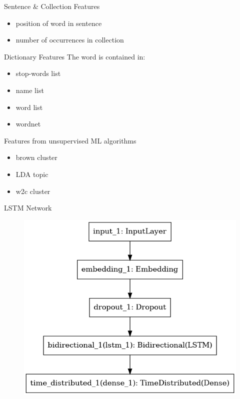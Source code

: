 \documentclass[12pt, tikz]{beamer}
\begin{document}
\begin{frame}[fragile]{Sentence \& Collection Features}
	\begin{itemize}
		\item position of word in sentence
		\item number of occurrences in collection
	\end{itemize}
\end{frame}

\begin{frame}[fragile]{Dictionary Features}
	The word is contained in:
	\begin{itemize}
		\item stop-words list
		\item name list
		\item word list
		\item wordnet
	\end{itemize}
\end{frame}

\begin{frame}[fragile]{Features from unsupervised ML algorithms}
	\begin{itemize}
		\item brown cluster
		\item LDA topic
		\item w2c cluster
	\end{itemize}
\end{frame}

\begin{frame}[fragile]{LSTM Network}
	\begin{figure}
		\includegraphics[width=0.8\textheight]{img/lstm_model.png}
	\end{figure}
\end{frame}
\end{document}
